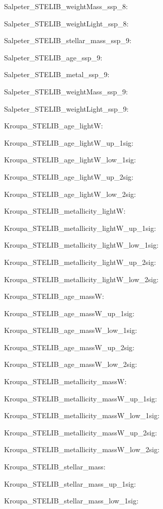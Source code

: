 \item Salpeter\_STELIB\_weightMass\_ssp\_8: 
\item Salpeter\_STELIB\_weightLight\_ssp\_8: 
\item Salpeter\_STELIB\_stellar\_mass\_ssp\_9: 
\item Salpeter\_STELIB\_age\_ssp\_9: 
\item Salpeter\_STELIB\_metal\_ssp\_9: 
\item Salpeter\_STELIB\_weightMass\_ssp\_9: 
\item Salpeter\_STELIB\_weightLight\_ssp\_9: 
\item Kroupa\_STELIB\_age\_lightW: 
\item Kroupa\_STELIB\_age\_lightW\_up\_1sig: 
\item Kroupa\_STELIB\_age\_lightW\_low\_1sig: 
\item Kroupa\_STELIB\_age\_lightW\_up\_2sig: 
\item Kroupa\_STELIB\_age\_lightW\_low\_2sig: 
\item Kroupa\_STELIB\_metallicity\_lightW: 
\item Kroupa\_STELIB\_metallicity\_lightW\_up\_1sig: 
\item Kroupa\_STELIB\_metallicity\_lightW\_low\_1sig: 
\item Kroupa\_STELIB\_metallicity\_lightW\_up\_2sig: 
\item Kroupa\_STELIB\_metallicity\_lightW\_low\_2sig: 
\item Kroupa\_STELIB\_age\_massW: 
\item Kroupa\_STELIB\_age\_massW\_up\_1sig: 
\item Kroupa\_STELIB\_age\_massW\_low\_1sig: 
\item Kroupa\_STELIB\_age\_massW\_up\_2sig: 
\item Kroupa\_STELIB\_age\_massW\_low\_2sig: 
\item Kroupa\_STELIB\_metallicity\_massW: 
\item Kroupa\_STELIB\_metallicity\_massW\_up\_1sig: 
\item Kroupa\_STELIB\_metallicity\_massW\_low\_1sig: 
\item Kroupa\_STELIB\_metallicity\_massW\_up\_2sig: 
\item Kroupa\_STELIB\_metallicity\_massW\_low\_2sig: 
\item Kroupa\_STELIB\_stellar\_mass: 
\item Kroupa\_STELIB\_stellar\_mass\_up\_1sig: 
\item Kroupa\_STELIB\_stellar\_mass\_low\_1sig: 
